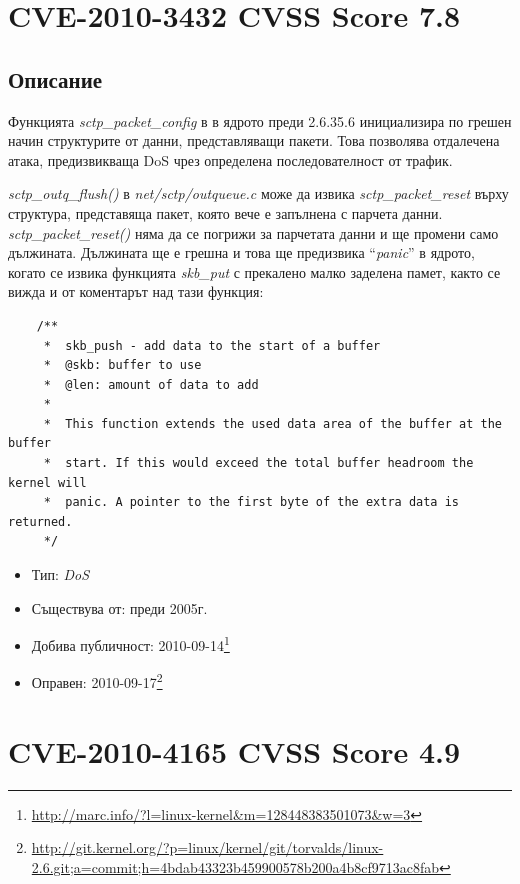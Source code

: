 \documentclass[a4paper,12pt,leqno]{article}
\begin{document}
\section{CVE-2010-3432 CVSS Score 7.8} %
\label{sec:CVE-2010-3432 Score 7.8}
\subsection{Описание}
Функцията \textit{sctp\_packet\_config} в  в ядрото преди 2.6.35.6 инициализира по
грешен начин структурите от данни, представляващи пакети. Това позволява отдалечена атака, предизвикваща DoS чрез определена последователност от  трафик.

\textit{sctp\_outq\_flush()} в \textit{net/sctp/outqueue.c}
може да извика \textit{sctp\_packet\_reset} върху
структура, представяща пакет, която вече е запълнена с парчета данни.
\textit{sctp\_packet\_reset()} няма да се погрижи за парчетата данни
и ще промени само дължината. Дължината ще е грешна и това ще предизвика
``\textit{panic}'' в ядрото, когато се извика функцията \textit{skb\_put} с
прекалено малко заделена памет, както се вижда и от коментарът над тази функция:
\begin{verbatim}
    /**
     *	skb_push - add data to the start of a buffer
     *	@skb: buffer to use
     *	@len: amount of data to add
     *
     *	This function extends the used data area of the buffer at the buffer
     *	start. If this would exceed the total buffer headroom the kernel will
     *	panic. A pointer to the first byte of the extra data is returned.
     */
\end{verbatim}

\begin{itemize}
    \item Тип: \textit{DoS}
    \item Съществува от: преди 2005г.
    \item Добива публичност: 2010-09-14\footnote{\url{http://marc.info/?l=linux-kernel&m=128448383501073&w=3}}
    \item Оправен: 2010-09-17\footnote{\url{http://git.kernel.org/?p=linux/kernel/git/torvalds/linux-2.6.git;a=commit;h=4bdab43323b459900578b200a4b8cf9713ac8fab}}
\end{itemize}


\section{CVE-2010-4165 CVSS Score 4.9} %
\label{sec:CVE-2010-4165 CVSS Score 4.9}
\end{document}

